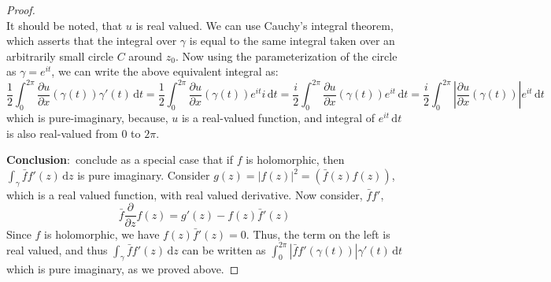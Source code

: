 \documentclass{article}[12pt]
\def\D{\mathrm{d}}
\begin{document}
\begin{proof}
\begin{equation}
       \end{equation}
       It should be noted, that $u$ is real valued.
       We can use Cauchy's integral theorem, which asserts that the
       integral over $\gamma$ is equal to the same integral taken over
       an arbitrarily small circle $C$ around $z_0$.
       Now using the parameterization of the circle
       as $\gamma=e^{it}$, we can write the above equivalent integral as:
         \[
         \frac{1}{2}\int_0^{2\pi} \frac{\partial u}{\partial x}(\gamma(t))\gamma'(t)\, \D t=
         \frac{1}{2}\int_0^{2\pi} \frac{\partial u}{\partial x}(\gamma(t))e^{it}i\, \D t =
         \frac{i}{2}\int_0^{2\pi}\frac{\partial u}{\partial x}(\gamma(t))e^{it}\, \D t =
         \frac{i}{2}\int_0^{2\pi}|\frac{\partial u}{\partial x}(\gamma(t))|e^{it}\, \D t
         \]
       which is pure-imaginary, because, $u$ is a real-valued function, and
       integral of $e^{it}\,\D t$ is also real-valued from $0$ to $2\pi$.

       {\bf Conclusion}:~conclude as a special case that if $f$ is
       holomorphic, then $\int_\gamma \bar{f}f'(z)\,\D z$ is pure imaginary.
       Consider $g(z)=|f(z)|^2=(\bar{f}(z)f(z))$, which is a real valued
       function, with real valued derivative. Now consider, $\bar{f}f'$,
       \[
       \bar{f}\frac{\partial}{\partial z} f(z) =g'(z)- f(z)\bar{f}'(z)
       \]
       Since $f$ is holomorphic, we have $f(z)\bar{f}'(z)=0$. Thus,
       the term on the left is real valued, and thus
       $\int_\gamma \bar{f}f'(z)\,\D z$ can
       be written as $\int_0^{2\pi} |\bar{f}f'(\gamma(t))|\gamma'(t)\,\D t$
       which is pure imaginary, as we proved above.

       
\end{proof}
\end{document}
